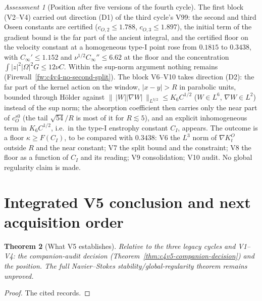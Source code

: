 \documentclass[11pt]{article}
\theoremstyle{plain}
\newtheorem{theorem}{Theorem}[section]
\theoremstyle{definition}
\theoremstyle{remark}
\newtheorem{assessment}[theorem]{Assessment}
\begin{document}
\begin{assessment}[Position after five versions of the fourth cycle]
\label{ass:c4v5-position-five}
The first block (V2--V4) carried out direction (D1) of the third
cycle's V99: the second and third Oseen constants are certified
(\(c_{O,2}\le1.788\), \(c_{O,3}\le1.897\)), the initial term of the gradient bound is
the far part of the ancient integral, and the certified floor on
the velocity constant at a homogeneous type-I point rose from \(0.1815\)
to \(0.3438\), with \(C_\infty'\le1.152\) and \(\nu^{1/2}C_\infty''\le6.62\) at the floor and the
concentration \(\int|z|^2|\Omega|^2G\le12\nu C\).  Within the sup-norm argument
nothing remains (Firewall~\ref{fw:c4v4-no-second-split}).  The block
V6--V10 takes direction (D2): the far part of the kernel action on the
window, \(|x-y|>R\) in parabolic units, bounded through H\"older against
\(\|\,|W||\nabla W|\,\|_{L^{3/2}}\le K_6C^{1/2}\) (\(W\in L^6\), \(\nabla W\in L^2\)) instead of the sup
norm; the absorption coefficient then carries only the near part of
\(c_O^{s0}\) (the tail \(\sqrt{54}/R\) is most of it for \(R\lesssim5\)), and an explicit
inhomogeneous term in \(K_6C^{1/2}\), i.e.\ in the type-I enstrophy constant
\(C_I\), appears.  The outcome is a floor \(\kappa\ge F(C_I)\), to be compared with
\(0.3438\): V6 the \(L^3\) norm of \(\nabla K^O_t\) outside \(R\) and the near constant;
V7 the split bound and the constraint; V8 the floor as a function of
\(C_I\) and its reading; V9 consolidation; V10 audit.  No global
regularity claim is made.
\end{assessment}

\section{Integrated V5 conclusion and next acquisition order}
\label{sec:c4v5-conclusion}

\begin{theorem}[What V5 establishes]
\label{thm:c4v5-conclusion}
Relative to the three legacy cycles and V1--V4: the companion-audit
decision (Theorem~\ref{thm:c4v5-companion-decision}) and the position.
The full Navier--Stokes stability/global-regularity theorem remains
unproved.
\end{theorem}

\begin{proof}
The cited records.
\end{proof}
\end{document}

